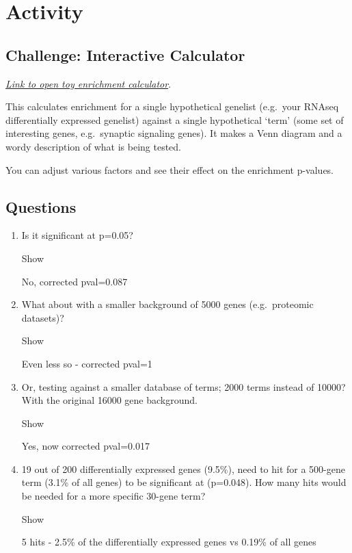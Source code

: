 \documentclass[
]{book}
\providecommand{\tightlist}{%
  \setlength{\itemsep}{0pt}\setlength{\parskip}{0pt}}
\begin{document}
\hypertarget{activity}{%
\section{Activity}\label{activity}}

\hypertarget{challenge-interactive-calculator}{%
\subsection*{\texorpdfstring{\textbf{Challenge:} Interactive Calculator}{Challenge: Interactive Calculator}}\label{challenge-interactive-calculator}}

\href{https://bioinformatics3.erc.monash.edu/rsconnect/content/241/}{\emph{Link to open toy enrichment calculator}}.

This calculates enrichment for a single hypothetical genelist (e.g.~your RNAseq differentially expressed genelist) against a single hypothetical `term' (some set of interesting genes, e.g.~synaptic signaling genes). It makes a Venn diagram and a wordy description of what is being tested.

You can adjust various factors and see their effect on the enrichment p-values.

\hypertarget{section-1}{%
\subsubsection*{}\label{section-1}}

\hypertarget{questions}{%
\subsection*{\texorpdfstring{\textbf{Questions}}{Questions}}\label{questions}}

\begin{enumerate}
\def\labelenumi{\arabic{enumi}.}
\tightlist
\item
  Is it significant at p=0.05?

  Show

  No, corrected pval=0.087
\item
  What about with a smaller background of 5000 genes (e.g.~proteomic datasets)?

  Show

  Even less so - corrected pval=1
\item
  Or, testing against a smaller database of terms; 2000 terms instead of 10000? With the original 16000 gene background.

  Show

  Yes, now corrected pval=0.017
\item
  19 out of 200 differentially expressed genes (9.5\%), need to hit for a 500-gene term (3.1\% of all genes) to be significant at (p=0.048). How many hits would be needed for a more specific 30-gene term?

  Show

  5 hits - 2.5\% of the differentially expressed genes vs 0.19\% of all genes
\end{enumerate}
\end{document}
